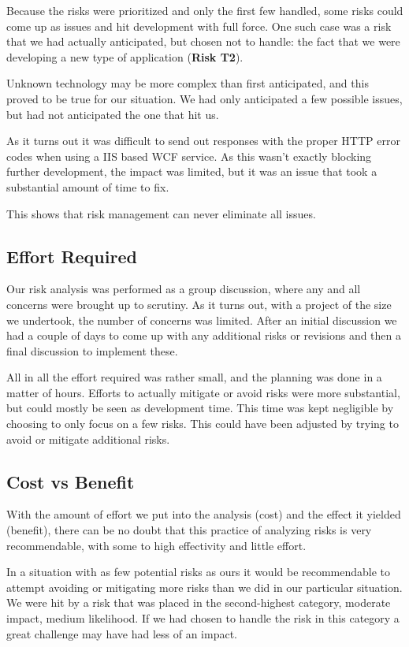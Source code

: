 Because the risks were prioritized and only the first few handled, some risks could come up as issues and
hit development with full force. One such case was a risk that we had actually anticipated, but chosen
not to handle: the fact that we were developing a new type of application (\textbf{Risk T2}).

Unknown technology may be more complex than first anticipated, and this proved to be true for our situation.
We had only anticipated a few possible issues, but had not anticipated the one that hit us.

As it turns out it was difficult to send out responses with the proper HTTP error codes when using a IIS based
WCF service. As this wasn't exactly blocking further development, the impact was limited, but it was an issue
that took a substantial amount of time to fix.

This shows that risk management can never eliminate all issues.

\subsection{Effort Required}

Our risk analysis was performed as a group discussion, where any and all concerns were brought up to scrutiny.
As it turns out, with a project of the size we undertook, the number of concerns was limited. After an initial
discussion we had a couple of days to come up with any additional risks or revisions and then a final discussion
to implement these.

All in all the effort required was rather small, and the planning was done in a matter of hours. Efforts to actually
mitigate or avoid risks were more substantial, but could mostly be seen as development time. This time was kept
negligible by choosing to only focus on a few risks. This could have been adjusted by trying to avoid or mitigate
additional risks.

\subsection{Cost vs Benefit}

With the amount of effort we put into the analysis (cost) and the effect it yielded (benefit), there can be no doubt
that this practice of analyzing risks is very recommendable, with some to high effectivity and little effort.

In a situation with as few potential risks as ours it would be recommendable to attempt avoiding or mitigating more
risks than we did in our particular situation. We were hit by a risk that was placed in the second-highest category,
moderate impact, medium likelihood. If we had chosen to handle the risk in this category a great challenge may have
had less of an impact.